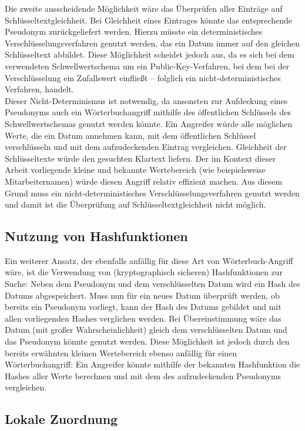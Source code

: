 Die zweite ausscheidende Möglichkeit wäre das Überprüfen aller Einträge auf Schlüsseltextgleichheit. Bei Gleichheit eines Eintrages könnte das entsprechende Pseudonym zurückgeliefert werden. Hierzu müsste ein deterministisches Verschlüsselungsverfahren genutzt werden, das ein Datum immer auf den gleichen Schlüsseltext abbildet. Diese Möglichkeit scheidet jedoch aus, da es sich bei dem verwendeten Schwellwertschema um ein Public-Key-Verfahren, bei dem bei der Verschlüsselung ein Zufallswert einfließt -- folglich ein nicht-deterministisches Verfahren, handelt.\\
Dieser Nicht-Determinismus ist notwendig, da ansonsten zur Aufdeckung eines Pseudonyms auch ein Wörterbuchangriff mithilfe des öffentlichen Schlüssels des Schwellwertschemas genutzt werden könnte. Ein Angreifer würde alle möglichen Werte, die ein Datum annehmen kann, mit dem öffentlichen Schlüssel verschlüsseln und mit dem aufzudeckenden Eintrag vergleichen. Gleichheit der Schlüsseltexte würde den gesuchten Klartext liefern. Der im Kontext dieser Arbeit vorliegende kleine und bekannte Wertebereich (wie beispielsweise Mitarbeiternamen) würde diesen Angriff relativ effizient machen. Aus diesem Grund muss ein nicht-deterministisches Verschlüsselungsverfahren genutzt werden und damit ist die Überprüfung auf Schlüsseltextgleichheit nicht möglich.


\subsection{Nutzung von Hashfunktionen}

Ein weiterer Ansatz, der ebenfalls anfällig für diese Art von Wörterbuch-Angriff wäre, ist die Verwendung von (kryptographisch sicheren) Hashfunktionen zur Suche: Neben dem Pseudonym und dem verschlüsselten Datum wird ein Hash des Datums abgespeichert. Muss nun für ein neues Datum überprüft werden, ob bereits ein Pseudonym vorliegt, kann der Hash des Datums gebildet und mit allen vorliegenden Hashes verglichen werden. Bei Übereinstimmung wäre das Datum (mit großer Wahrscheinlichkeit) gleich dem verschlüsselten Datum und das Pseudonym könnte genutzt werden. Diese Möglichkeit ist jedoch durch den bereits erwähnten kleinen Wertebereich ebenso anfällig für einen Wörterbuchangriff: Ein Angreifer könnte mithilfe der bekannten Hashfunktion die Hashes aller Werte berechnen und mit dem des aufzudeckenden Pseudonyms vergleichen.

\subsection{Lokale Zuordnung}

